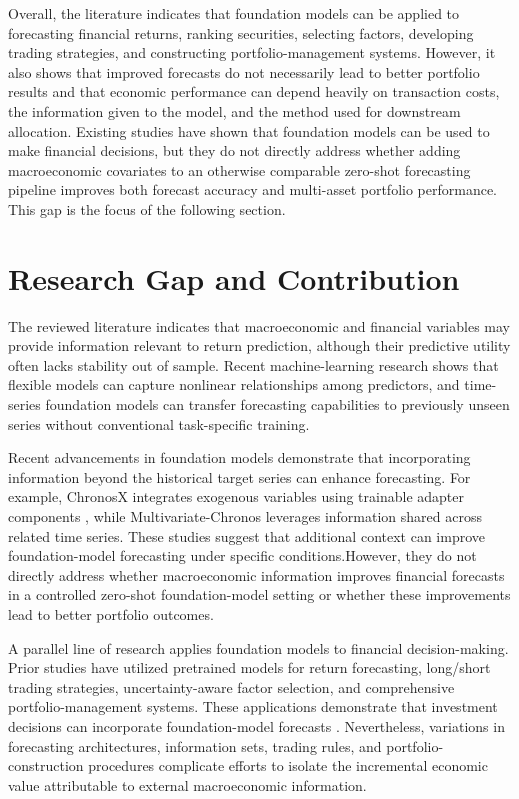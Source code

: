 \documentclass[12pt,a4paper,twoside,openany]{book}
\begin{document}
Overall, the literature indicates that foundation models can be applied to forecasting financial returns, ranking securities, selecting factors, developing trading strategies, and constructing portfolio-management systems. However, it also shows that improved forecasts do not necessarily lead to better portfolio results and that economic performance can depend heavily on transaction costs, the information given to the model, and the method used for downstream allocation. Existing studies have shown that foundation models can be used to make financial decisions, but they do not directly address whether adding macroeconomic covariates to an otherwise comparable zero-shot forecasting pipeline improves both forecast accuracy and multi-asset portfolio performance. This gap is the focus of the following section.


\section{Research Gap and Contribution}\label{research-gap and contribution}

The reviewed literature indicates that macroeconomic and financial variables may provide information relevant to return prediction, although their predictive utility often lacks stability out of sample. Recent machine-learning research shows that flexible models can capture nonlinear relationships among predictors, and time-series foundation models can transfer forecasting capabilities to previously unseen series without conventional task-specific training.

Recent advancements in foundation models demonstrate that incorporating information beyond the historical target series can enhance forecasting. For example, ChronosX integrates exogenous variables using trainable adapter components \cite{arango2025chronosx}, while Multivariate-Chronos leverages information shared across related time series. These studies suggest that additional context can improve foundation-model forecasting under specific conditions.However, they do not directly address whether macroeconomic information improves financial forecasts in a controlled zero-shot foundation-model setting or whether these improvements lead to better portfolio outcomes.

A parallel line of research applies foundation models to financial decision-making. Prior studies have utilized pretrained models for return forecasting, long/short trading strategies, uncertainty-aware factor selection, and comprehensive portfolio-management systems. These applications demonstrate that investment decisions can incorporate foundation-model forecasts \cite{noguer2026pretrained}. Nevertheless, variations in forecasting architectures, information sets, trading rules, and portfolio-construction procedures complicate efforts to isolate the incremental economic value attributable to external macroeconomic information.
\end{document}
